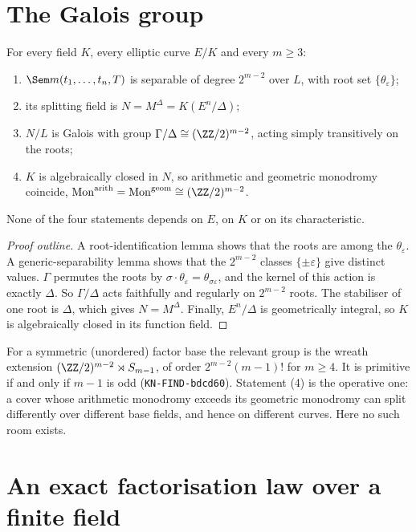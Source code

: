 \section{The Galois group}

\begin{theorem}\label{thm:cover}
For every field $K$, every elliptic curve $E/K$ and every $m\ge3$:
\begin{enumerate}
\item $\Sem m(t_1,\dots,t_n,T)$ is separable of degree $2^{m-2}$ over $L$,
  with root set $\{\theta_\varepsilon\}$;
\item its splitting field is $N=M^\Delta=K(E^n/\Delta)$;
\item $N/L$ is Galois with group $\Gamma/\Delta\cong(\ZZ/2)^{m-2}$, acting
  simply transitively on the roots;
\item $K$ is algebraically closed in $N$, so arithmetic and geometric
  monodromy coincide, $\mathrm{Mon}^{\mathrm{arith}}=\mathrm{Mon}^{\mathrm{geom}}\cong(\ZZ/2)^{m-2}$.
\end{enumerate}
None of the four statements depends on $E$, on $K$ or on its
characteristic.
\end{theorem}

\begin{proof}[Proof outline]
A root-identification lemma shows that the roots are among the
$\theta_\varepsilon$. A generic-separability lemma shows that the
$2^{m-2}$ classes $\{\pm\varepsilon\}$ give distinct values. $\Gamma$
permutes the roots by $\sigma\cdot\theta_\varepsilon=\theta_{\sigma\varepsilon}$,
and the kernel of this action is exactly $\Delta$. So $\Gamma/\Delta$ acts
faithfully and regularly on $2^{m-2}$ roots. The stabiliser of one root is
$\Delta$, which gives $N=M^\Delta$. Finally, $E^n/\Delta$ is geometrically
integral, so $K$ is algebraically closed in its function field.
\end{proof}

For a symmetric (unordered) factor base the relevant group is the wreath
extension $(\ZZ/2)^{m-2}\rtimes S_{m-1}$, of order $2^{m-2}(m-1)!$ for
$m\ge4$. It is primitive if and only if $m-1$ is odd
(\texttt{KN-FIND-bdcd60}). Statement (4) is the operative one: a cover
whose arithmetic monodromy exceeds its geometric monodromy can split
differently over different base fields, and hence on different curves.
Here no such room exists.

\section{An exact factorisation law over a finite field}

